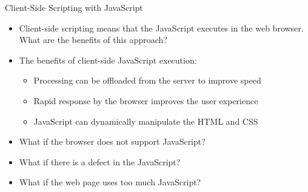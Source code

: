\documentclass[14pt,aspectratio=169]{beamer}
\begin{document}
%
\begin{frame}{Client-Side Scripting with JavaScript}
  \begin{itemize}
    \item Client-side scripting means that the JavaScript executes in the web
      browser. What are the benefits of this approach?
      \vspace*{-.15in}
    \item The benefits of client-side JavaScript execution:
      \begin{itemize}
        \item Processing can be offloaded from the server to improve speed
        \item Rapid response by the browser improves the user experience
        \item JavaScript can dynamically manipulate the HTML and CSS
      \end{itemize}
      \vspace*{-.2in}
    \item What if the browser does not support JavaScript?
      \vspace*{-.2in}
    \item What if there is a defect in the JavaScript?
      \vspace*{-.2in}
    \item What if the web page uses too much JavaScript?
  \end{itemize}
\end{frame}
\end{document}
